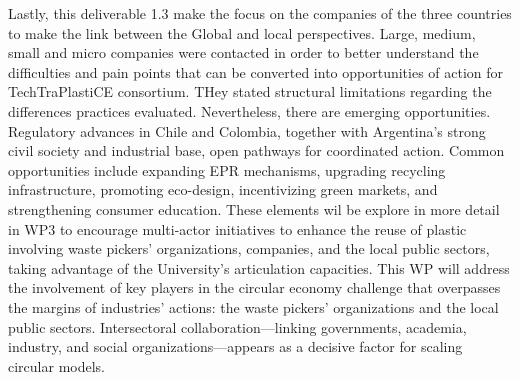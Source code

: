 \documentclass[
  12pt,
  oneside]{book}
\begin{document}
Lastly, this deliverable 1.3 make the focus on the companies of the
three countries to make the link between the Global and local
perspectives. Large, medium, small and micro companies were contacted in
order to better understand the difficulties and pain points that can be
converted into opportunities of action for TechTraPlastiCE consortium.
THey stated structural limitations regarding the differences practices
evaluated. Nevertheless, there are emerging opportunities. Regulatory
advances in Chile and Colombia, together with Argentina's strong civil
society and industrial base, open pathways for coordinated action.
Common opportunities include expanding EPR mechanisms, upgrading
recycling infrastructure, promoting eco-design, incentivizing green
markets, and strengthening consumer education. These elements wil be
explore in more detail in WP3 to encourage multi-actor initiatives to
enhance the reuse of plastic involving waste pickers' organizations,
companies, and the local public sectors, taking advantage of the
University's articulation capacities. This WP will address the
involvement of key players in the circular economy challenge that
overpasses the margins of industries' actions: the waste pickers'
organizations and the local public sectors. Intersectoral
collaboration---linking governments, academia, industry, and social
organizations---appears as a decisive factor for scaling circular
models.
\end{document}
